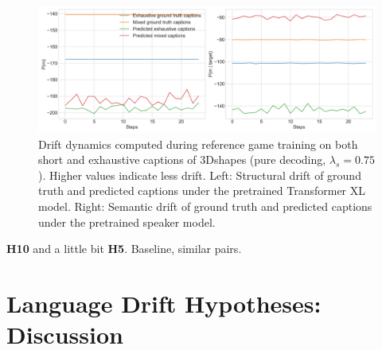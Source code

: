 \begin{figure}
	\centering
	\includegraphics[width=\linewidth]{images/3dshapes_exh_short_structural_semantic_drift_49_pure_075_similarFixed.png}
	\caption{Drift dynamics computed during reference game training on both short and exhaustive captions of 3Dshapes (pure decoding, $\lambda_s=0.75$). Higher values indicate less drift. Left: Structural drift of ground truth and predicted captions under the pretrained Transformer XL model. Right: Semantic drift of ground truth and predicted captions under the pretrained speaker model.}
	\label{fig:3dshapes_wShort_similarFixed_075_str_sem_drift}
\end{figure}

\textbf{H10} and a little bit \textbf{H5}.
Baseline, similar pairs.




\section{Language Drift Hypotheses: Discussion}

